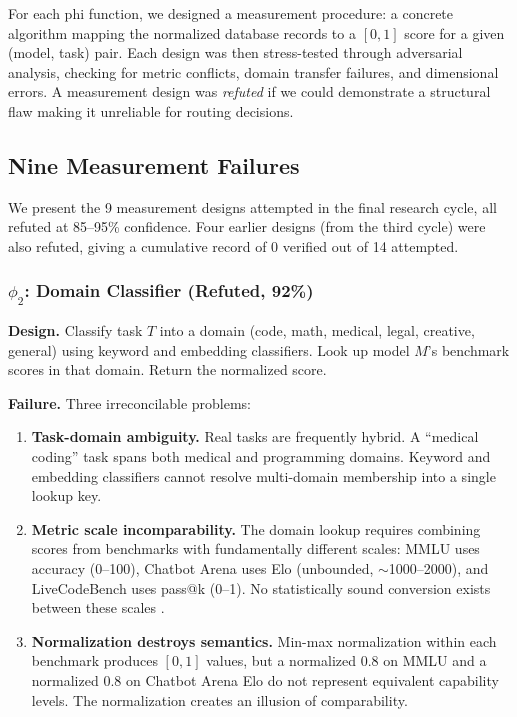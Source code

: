 For each phi function, we designed a measurement procedure: a concrete algorithm mapping the normalized database records to a $[0,1]$ score for a given (model, task) pair. Each design was then stress-tested through adversarial analysis, checking for metric conflicts, domain transfer failures, and dimensional errors. A measurement design was \emph{refuted} if we could demonstrate a structural flaw making it unreliable for routing decisions.

\subsection{Nine Measurement Failures}

We present the 9 measurement designs attempted in the final research cycle, all refuted at 85--95\% confidence. Four earlier designs (from the third cycle) were also refuted, giving a cumulative record of 0 verified out of 14 attempted.

\subsubsection{$\phi_2$: Domain Classifier (Refuted, 92\%)}

\textbf{Design.} Classify task $T$ into a domain (code, math, medical, legal, creative, general) using keyword and embedding classifiers. Look up model $M$'s benchmark scores in that domain. Return the normalized score.

\textbf{Failure.} Three irreconcilable problems:
\begin{enumerate}
    \item \textbf{Task-domain ambiguity.} Real tasks are frequently hybrid. A ``medical coding'' task spans both medical and programming domains. Keyword and embedding classifiers cannot resolve multi-domain membership into a single lookup key.
    \item \textbf{Metric scale incomparability.} The domain lookup requires combining scores from benchmarks with fundamentally different scales: MMLU uses accuracy (0--100), Chatbot Arena uses Elo (unbounded, $\sim$1000--2000), and LiveCodeBench uses pass@k (0--1). No statistically sound conversion exists between these scales \citep{deng2023leaderboards}.
    \item \textbf{Normalization destroys semantics.} Min-max normalization within each benchmark produces $[0,1]$ values, but a normalized 0.8 on MMLU and a normalized 0.8 on Chatbot Arena Elo do not represent equivalent capability levels. The normalization creates an illusion of comparability.
\end{enumerate}

